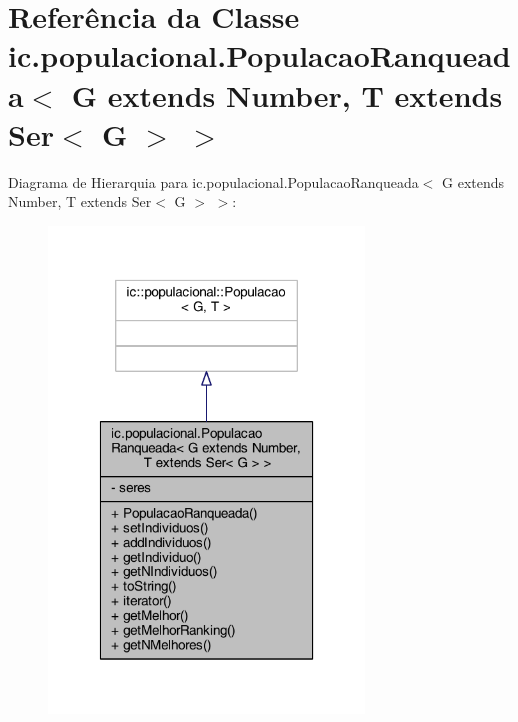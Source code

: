 \hypertarget{classic_1_1populacional_1_1_populacao_ranqueada_3_01_g_01extends_01_number_00_01_t_01extends_01_ser_3_01_g_01_4_01_4}{\section{Referência da Classe ic.\-populacional.\-Populacao\-Ranqueada$<$ G extends Number, T extends Ser$<$ G $>$ $>$}
\label{classic_1_1populacional_1_1_populacao_ranqueada_3_01_g_01extends_01_number_00_01_t_01extends_01_ser_3_01_g_01_4_01_4}
}


Diagrama de Hierarquia para ic.\-populacional.\-Populacao\-Ranqueada$<$ G extends Number, T extends Ser$<$ G $>$ $>$\-:\nopagebreak
\begin{figure}[H]
\begin{center}
\leavevmode
\includegraphics[width=238pt]{classic_1_1populacional_1_1_populacao_ranqueada_3_01_g_01extends_01_number_00_01_t_01extends_01_56f84eaf5d2b33a642bdb0beae059913}
\end{center}
\end{figure}


